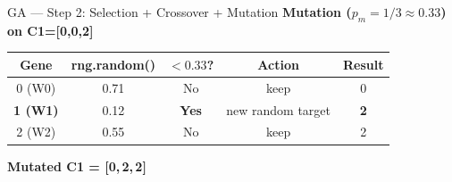\documentclass[aspectratio=169]{beamer}
\begin{document}
\begin{frame}{GA --- Step 2: Selection + Crossover + Mutation}
  \vspace{0.2cm}
  \colorbox{navymid}{\color{teallt}\bfseries\small
    Mutation ($p_m=1/3\approx0.33$) on C1=[0,0,2]}
  \vspace{3pt}

  \begin{tabular}{ccccc}
    \toprule
    \rowcolor{navy}
      \color{white}\bfseries Gene &
      \color{white}\bfseries rng.random() &
      \color{white}\bfseries $<0.33$? &
      \color{white}\bfseries Action &
      \color{white}\bfseries Result \\
    \midrule
    0 (W0) & 0.71 & No  & keep & 0 \\
    \rowcolor{lightyellow}
    \bfseries 1 (W1) & 0.12 &
      \cellcolor{amber}\color{white}\bfseries Yes &
      new random target &
      \cellcolor{amber}\color{white}\bfseries 2 \\
    2 (W2) & 0.55 & No  & keep & 2 \\
    \bottomrule
  \end{tabular}

  \vspace{3pt}
  {\small\bfseries\color{teal} Mutated C1 = [0,\,2,\,2]}
\end{frame}
\end{document}
